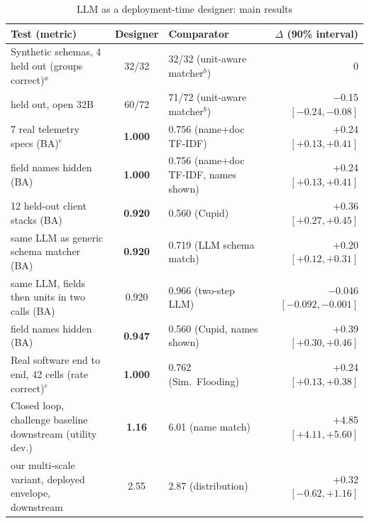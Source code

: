 \begin{table}[t]
\centering
\begin{threeparttable}
\caption{LLM as a deployment-time designer: main results}
\label{tab:designer}
\footnotesize
\setlength{\tabcolsep}{4pt}
\begin{tabular}{@{}l c l r@{}}
\toprule
Test (metric) & Designer & Comparator & $\Delta$ (90\% interval) \\
\midrule
Synthetic schemas, 4 held out (groups correct)$^{a}$ & 32/32 & 32/32 (unit-aware matcher$^{b}$) & 0 \\
\quad 9 held out, open 32B & 60/72 & 71/72 (unit-aware matcher$^{b}$) & $-$0.15 $[-0.24, -0.08]$ \\
7 real telemetry specs (BA)$^{e}$ & \cellcolor{favour}\bfseries 1.000 & 0.756 (name+doc TF-IDF) & +0.24 $[+0.13, +0.41]$ \\
\quad field names hidden (BA) & \cellcolor{favour}\bfseries 1.000 & 0.756 (name+doc TF-IDF, names shown) & +0.24 $[+0.13, +0.41]$ \\
12 held-out client stacks (BA) & \cellcolor{favour}\bfseries 0.920 & 0.560 (Cupid) & +0.36 $[+0.27, +0.45]$ \\
\quad same LLM as generic schema matcher (BA) & \cellcolor{favour}\bfseries 0.920 & 0.719 (LLM schema match) & +0.20 $[+0.12, +0.31]$ \\
\quad same LLM, fields then units in two calls (BA) & 0.920 & 0.966 (two-step LLM) & $-$0.046 $[-0.092, -0.001]$ \\
\quad field names hidden (BA) & \cellcolor{favour}\bfseries 0.947 & 0.560 (Cupid, names shown) & +0.39 $[+0.30, +0.46]$ \\
Real software end to end, 42 cells (rate correct)$^{e}$ & \cellcolor{favour}\bfseries 1.000 & 0.762 (Sim.\ Flooding) & +0.24 $[+0.13, +0.38]$ \\
Closed loop, challenge baseline downstream (utility dev.) & \cellcolor{favour}\bfseries 1.16 & 6.01 (name match) & +4.85 $[+4.11, +5.60]$ \\
\quad our multi-scale variant, deployed envelope, downstream & 2.55 & 2.87 (distribution) & +0.32 $[-0.62, +1.16]$ \\

\end{tabular}
\end{threeparttable}
\end{table}
